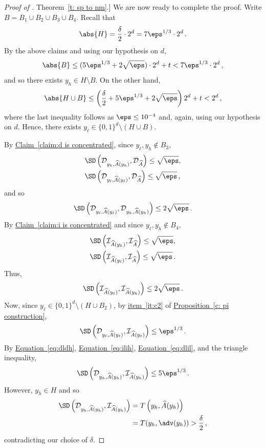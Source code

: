 \documentclass[11pt]{article}
\numberwithin{equation}{section}
\theoremstyle{definition}
\theoremstyle{plain}
\newcommand{\expref}[2]{\hyperref[#2]{#1~\ref{#2}}}
\newcommand{\expeqref}[2]{\hyperref[#2]{#1~\eqref{#2}}}
\begin{document}
\begin{proof}[Proof of \expref{Theorem}{t: sp to nm}.]
We are now ready to complete the proof. Write $B = B_1 \cup B_2 \cup B_3 \cup B_4$. Recall that \[\abs{H} = \frac{\delta}{2}\cdot 2^d = 7\eps^{1/3} \cdot 2^d\,.\]
By the above claims and using our hypothesis on $d$,
\[
\abs{B} \leq (5\eps^{1/3} + 2\sqrt{\eps})\cdot 2^d + t < 7\eps^{1/3} \cdot 2^d\,,
\]
and so there exists $y_h \in H \setminus B$.  On the other hand, 
\[
\abs{H \cup B} \le \left(\frac{\delta}{2} + 5\eps^{1/3} + 2\sqrt{\eps}  \right) 2^d + t < 2^d\,,
\]
where the last inequality follows as $\eps \leq 10^{-4}$ and, again, using our hypothesis on $d$. Hence, there exists $y_\ell \in \{0,1\}^d \setminus (H \cup B)$. 

By \expref{Claim}{claim:d is concentrated}, since $y_\ell,y_h \notin B_3$,
\begin{align*}
&\SD\left(\mathcal{D}_{y_h,\widehat{A}(y_h)}, \mathcal{D}_{\widehat{A}} \right) \le \sqrt{\eps}, \\
&\SD\left(\mathcal{D}_{y_\ell,\widehat{A}(y_\ell)}, \mathcal{D}_{\widehat{A}} \right) \le \sqrt{\eps}\,,
\end{align*}
and so
\begin{equation}\label{eq:dldh}
\SD\left(\mathcal{D}_{y_\ell,\widehat{A}(y_\ell)}, \mathcal{D}_{y_h,\widehat{A}(y_h)}\right) \le 2\sqrt{\eps}\,.
\end{equation}
By \expref{Claim}{claim:i is concentrated} and since $y_\ell,y_h \notin B_4$,
\begin{align*}
&\SD\left(\mathcal{I}_{\widehat{A}(y_h)}, \mathcal{I}_{\widehat{A}} \right) \le \sqrt{\eps}, \\
&\SD\left(\mathcal{I}_{\widehat{A}(y_\ell)}, \mathcal{I}_{\widehat{A}} \right) \le \sqrt{\eps}\,.
\end{align*}
Thus,
\begin{equation}\label{eq:ilih}
\SD\left(\mathcal{I}_{\widehat{A}(y_\ell)}, \mathcal{I}_{\widehat{A}(y_h)} \right) \le 2\sqrt{\eps}\,.
\end{equation}
Now, since $y_\ell \in \{0,1\}^d \setminus (H \cup B_2)$, by \expeqref{item}{it:c2} of \expref{Proposition}{c: pi construction},
\begin{equation}\label{eq:dlil}
\SD\left(\mathcal{D}_{y_\ell,\widehat{A}(y_\ell)}, \mathcal{I}_{\widehat{A}(y_\ell)}\right) \le \eps^{1/3}\,.
\end{equation}
By \expeqref{Equation}{eq:dldh}, \expeqref{Equation}{eq:ilih}, \expeqref{Equation}{eq:dlil}, and the triangle inequality,
\[
\SD\left(\mathcal{D}_{y_h,\widehat{A}(y_h)}, \mathcal{I}_{\widehat{A}(y_h)}\right) \le 5 \eps^{1/3}\,.
\]
However, $y_h \in H$ and so
\begin{align*}
\SD\left( \mathcal{D}_{y_h,\widehat{A}(y_h)}, \mathcal{I}_{\widehat{A}(y_h)} \right) &= T\left(y_h,\widehat{A}(y_h)\right) \\
&= T(y_h, \adv(y_h)) > \frac{\delta}{2}\,,
\end{align*}
contradicting our choice of $\delta$.
\end{proof}
\end{document}
